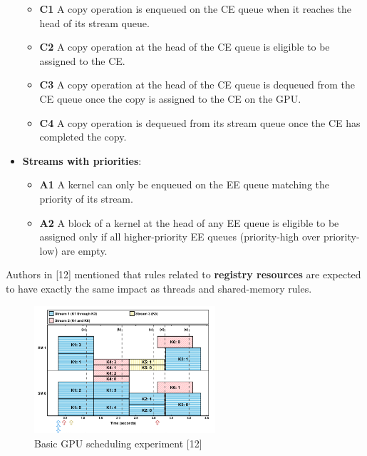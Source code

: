 \documentclass[
  12pt,
  a4paperpaper,
]{report}
\providecommand{\tightlist}{%
  \setlength{\itemsep}{0pt}\setlength{\parskip}{0pt}}
\begin{document}
\begin{itemize}
  \begin{itemize}
  \tightlist
  \item
    \textbf{C1} A copy operation is enqueued on the CE queue when it
    reaches the head of its stream queue.
  \item
    \textbf{C2} A copy operation at the head of the CE queue is eligible
    to be assigned to the CE.
  \item
    \textbf{C3} A copy operation at the head of the CE queue is dequeued
    from the CE queue once the copy is assigned to the CE on the GPU.
  \item
    \textbf{C4} A copy operation is dequeued from its stream queue once
    the CE has completed the copy.
  \end{itemize}
\item
  \textbf{Streams with priorities}:

  \begin{itemize}
  \tightlist
  \item
    \textbf{A1} A kernel can only be enqueued on the EE queue matching
    the priority of its stream.
  \item
    \textbf{A2} A block of a kernel at the head of any EE queue is
    eligible to be assigned only if all higher-priority EE queues
    (priority-high over priority-low) are empty.
  \end{itemize}
\end{itemize}

Authors in {[}12{]} mentioned that rules related to \textbf{registry
resources} are expected to have exactly the same impact as threads and
shared-memory rules.

\begin{figure}
\centering
\includegraphics[width=0.6\textwidth,height=\textheight]{source/figures/scheduler_blocks.png}
\caption{Basic GPU scheduling experiment {[}12{]}
\label{img:scheduler_blocks}}
\end{figure}
\end{document}
